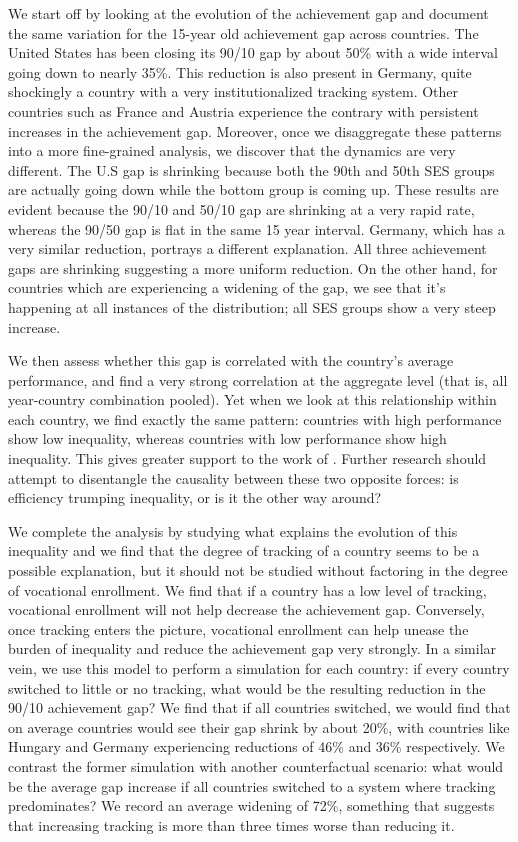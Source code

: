 \documentclass[11pt, a4paper]{article}\usepackage[]{graphicx}\usepackage[]{color}
\begin{document}
We start off by looking at the evolution of the achievement gap and document the same variation for the 15-year old achievement gap across countries. The United States has been closing its 90/10 gap by about 50\% with a wide interval going down to nearly 35\%. This reduction is also present in Germany, quite shockingly a country with a very institutionalized tracking system. Other countries such as France and Austria experience the contrary with persistent increases in the achievement gap. Moreover, once we disaggregate these patterns into a more fine-grained analysis, we discover that the dynamics are very different. The U.S gap is shrinking because both the 90th and 50th SES groups are actually going down while the bottom group is coming up. These results are evident because the 90/10 and 50/10 gap are shrinking at a very rapid rate, whereas the 90/50 gap is flat in the same 15 year interval. Germany, which has a very similar reduction, portrays a different explanation. All three achievement gaps are shrinking suggesting a more uniform reduction. On the other hand, for countries which are experiencing a widening of the gap, we see that it's happening at all instances of the distribution; all SES groups show a very steep increase.

We then assess whether this gap is correlated with the country's average performance, and find a very strong correlation at the aggregate level (that is, all year-country combination pooled). Yet when we look at this relationship within each country, we find exactly the same pattern: countries with high performance show low inequality, whereas countries with low performance show high inequality. This gives greater support to the work of \citet{werfhorst_mijs}. Further research should attempt to disentangle the causality between these two opposite forces: is efficiency trumping inequality, or is it the other way around?

We complete the analysis by studying what explains the evolution of this inequality and we find that the degree of tracking of a country seems to be a possible explanation, but it should not be studied without factoring in the degree of vocational enrollment. We find that if a country has a low level of tracking, vocational enrollment will not help decrease the achievement gap. Conversely, once tracking enters the picture, vocational enrollment can help unease the burden of inequality and reduce the achievement gap very strongly. In a similar vein, we use this model to perform a simulation for each country: if every country switched to little or no tracking, what would be the resulting reduction in the 90/10 achievement gap? We find that if all countries switched, we would find that on average countries would see their gap shrink by about 20\%, with countries like Hungary and Germany experiencing reductions of 46\% and 36\% respectively. We contrast the former simulation with another counterfactual scenario: what would be the average gap increase if all countries switched to a system where tracking predominates? We record an average widening of 72\%, something that suggests that increasing tracking is more than three times worse than reducing it.
\end{document}
